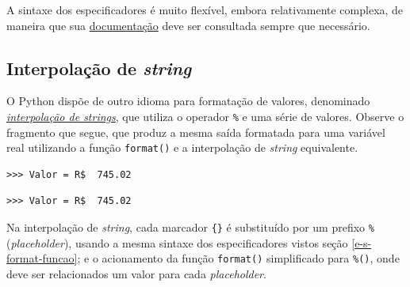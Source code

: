 \documentclass[
]{book}
\newenvironment{Shaded}{\begin{snugshade}}{\end{snugshade}}
\newcommand{\BuiltInTok}[1]{#1}
\newcommand{\FloatTok}[1]{\textcolor[rgb]{0.00,0.00,0.81}{#1}}
\newcommand{\NormalTok}[1]{#1}
\newcommand{\OperatorTok}[1]{\textcolor[rgb]{0.81,0.36,0.00}{\textbf{#1}}}
\newcommand{\SpecialCharTok}[1]{\textcolor[rgb]{0.00,0.00,0.00}{#1}}
\newcommand{\StringTok}[1]{\textcolor[rgb]{0.31,0.60,0.02}{#1}}
\begin{document}
A sintaxe dos especificadores é muito flexível, embora relativamente complexa, de maneira que sua \href{https://docs.python.org/3/library/string.html\#formatspec}{documentação} deve ser consultada sempre que necessário.

\hypertarget{e-s-format-inter}{%
\subsection{\texorpdfstring{Interpolação de \emph{string}}{Interpolação de string}}\label{e-s-format-inter}}

O Python dispõe de outro idioma para formatação de valores, denominado \href{https://docs.python.org/3/tutorial/inputoutput.html\#old-string-formatting}{\emph{interpolação de strings}}, que utiliza o operador \texttt{\%} e uma série de valores. Observe o fragmento que segue, que produz a mesma saída formatada para uma variável real utilizando a função \texttt{format()} e a interpolação de \emph{string} equivalente.

\begin{Shaded}
\end{Shaded}

\begin{verbatim}
>>> Valor = R$  745.02
\end{verbatim}

\begin{Shaded}
\end{Shaded}

\begin{verbatim}
>>> Valor = R$  745.02
\end{verbatim}

Na interpolação de \emph{string}, cada marcador \texttt{\{\}} é substituído por um prefixo \texttt{\%} (\emph{placeholder}), usando a mesma sintaxe dos especificadores vistos seção \ref{e-s-format-funcao}; e o acionamento da função \texttt{format()} simplificado para \texttt{\%()}, onde deve ser relacionados um valor para cada \emph{placeholder}.
\end{document}
